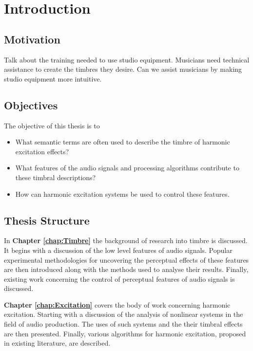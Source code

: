 \chapter{Introduction}
\label{chap:Introduction}

\section{Motivation}
\label{sec:Introduction-Motivation}
	\note
	{
		Talk about the training needed to use studio equipment. Musicians need technical assistance to create the
		timbres they desire. Can we assist musicians by making studio equipment more intuitive.
	}

\section{Objectives}
\label{sec:Introduction-Objectives}
	The objective of this thesis is to 

	\begin{itemize}
		\item What semantic terms are often used to describe the timbre of harmonic excitation effects?
		\item What features of the audio signals and processing algorithms contribute to these timbral descriptions?
		\item How can harmonic excitation systems be used to control these features.
	\end{itemize}

\section{Thesis Structure}
\label{sec:Introduction-ThesisStructure}
	In {\bf{Chapter \ref{chap:Timbre}}} the background of research into timbre is discussed. It begins with a discussion
	of the low level features of audio signals. Popular experimental methodologies for uncovering the perceptual effects
	of these features are then introduced along with the methods used to analyse their results. Finally, existing work
	concerning the control of perceptual features of audio signals is discussed.

	{\bf{Chapter \ref{chap:Excitation}}} covers the body of work concerning harmonic excitation. Starting with a
	discussion of the analysis of nonlinear systems in the field of audio production. The uses of such systems and the
	their timbral effects are then presented. Finally, various algorithms for harmonic excitation, proposed in existing
	literature, are described.

